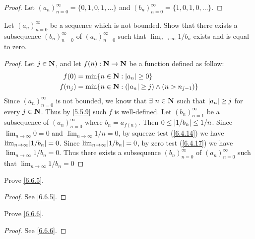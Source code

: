 \begin{proof}
  Let \((a_n)_{n = 0}^\infty = \{0, 1, 0, 1, \dots\}\) and \((b_n)_{n = 0}^\infty = \{1, 0, 1, 0, \dots\}\).
\end{proof}

\begin{exercise}\label{ex 6.6.3}
  Let \((a_n)_{n = 0}^\infty\) be a sequence which is not bounded.
  Show that there exists a subsequence \((b_n)_{n = 0}^\infty\) of \((a_n)_{n = 0}^\infty\) such that \(\lim_{n \to \infty} 1 / b_n\) exists and is equal to zero.
\end{exercise}

\begin{proof}
  Let \(j \in \mathbf{N}\), and let \(f(n) : \mathbf{N} \to \mathbf{N}\) be a function defined as follow:
  \begin{align*}
    f(0)   & = \min\{n \in \mathbf{N} : \left\lvert a_n\right\rvert \geq 0\}                         \\
    f(n_j) & = \min\{n \in \mathbf{N} : (\left\lvert a_n\right\rvert \geq j) \land (n > n_{j - 1})\}
  \end{align*}
  Since \((a_n)_{n = 0}^\infty\) is not bounded, we know that \(\exists\ n \in \mathbf{N}\) such that \(\left\lvert a_n\right\rvert \geq j\) for every \(j \in \mathbf{N}\).
  Thus by \cref{5.5.9} such \(f\) is well-defined.
  Let \((b_n)_{n = 1}^\infty\) be a subsequence of \((a_n)_{n = 0}^\infty\) where \(b_n = a_{f(n)}\).
  Then \(0 \leq \left\lvert1 / b_n\right\rvert \leq 1 / n\).
  Since \(\lim_{n \to \infty} 0 = 0\) and \(\lim_{n \to \infty} 1 / n = 0\), by squeeze test (\cref{6.4.14}) we have \(\lim_{n \to \infty} \abs{1 / b_n} = 0\).
  Since \(\lim_{n \to \infty} \abs{1 / b_n} = 0\), by zero test (\cref{6.4.17}) we have \(\lim_{n \to \infty} 1 / b_n = 0\).
  Thus there exists a subsequence \((b_n)_{n = 0}^\infty\) of \((a_n)_{n = 0}^\infty\) such that \(\lim_{n \to \infty} 1 / b_n = 0\)
\end{proof}

\begin{exercise}\label{ex 6.6.4}
  Prove \cref{6.6.5}.
\end{exercise}

\begin{proof}
  See \cref{6.6.5}.
\end{proof}

\begin{exercise}\label{ex 6.6.5}
  Prove \cref{6.6.6}.
\end{exercise}

\begin{proof}
  See \cref{6.6.6}.
\end{proof}